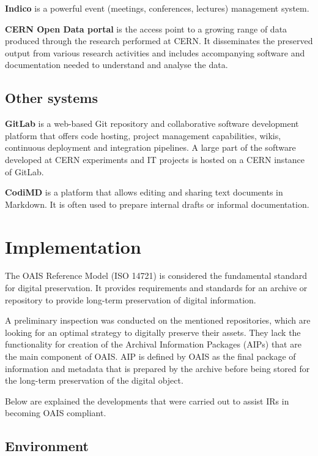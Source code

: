 \documentclass[11pt]{IEEEtran}
\begin{document}
\textbf{Indico} is a powerful event (meetings, conferences, lectures) management system.

\textbf{CERN Open Data portal} is the access point to a growing range of data produced through the research performed at CERN. It disseminates the preserved output from various research activities and includes accompanying software and documentation needed to understand and analyse the data.

\subsection{Other systems}


\textbf{GitLab} is a web-based Git repository and collaborative software development platform that offers code hosting, project management capabilities, wikis, continuous deployment and integration pipelines. A large part of the software developed at CERN experiments and IT projects is hosted on a CERN instance of GitLab.

\textbf{CodiMD} is a platform that allows editing and sharing text documents in Markdown. It is often used to prepare internal drafts or informal documentation.


\section{Implementation}

The OAIS Reference Model\cite{OAIS2002} (ISO 14721) is considered the fundamental standard for digital preservation. It provides requirements and standards for an archive or repository to provide long-term preservation of digital information.

A preliminary inspection was conducted on the mentioned repositories, which are looking for an optimal strategy to digitally preserve their assets. They lack the functionality for creation of the Archival Information Packages (AIPs) that are the main component of OAIS. AIP is defined by OAIS as the final package of information and metadata that is prepared by the archive before being stored for the long-term preservation of the digital object.

Below are explained the developments that were carried out to assist IRs in becoming OAIS compliant.

\subsection{Environment}
\end{document}

